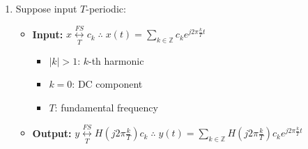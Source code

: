 \begin{derivation}
\begin{enumerate}
        \item Suppose input \( T \)-periodic:

        \begin{center}
        \end{center}
        \begin{itemize}
            \item \textbf{Input:} $ x \underset{T}{\overset{FS}{\leftrightarrow}} c_k \; \therefore \; x(t) = \sum_{k \in \mathbb{Z}} c_k e^{j 2 \pi \frac{k}{T} t}$
            \begin{itemize}
                \item \( |k| > 1 \): \( k \)-th harmonic
                \item \( k = 0 \): DC component
                \item \( T \): fundamental frequency
            \end{itemize}
            \item \textbf{Output:} $y \underset{T}{\overset{FS}{\leftrightarrow}} H\left( j 2 \pi \frac{k}{T} \right) c_k \; \therefore \; y(t) = \sum_{k \in \mathbb{Z}} H\left( j 2 \pi \frac{k}{T} \right) c_k e^{j 2 \pi \frac{k}{T} t}$ 
        \end{itemize}
    \end{enumerate}
\end{derivation}

